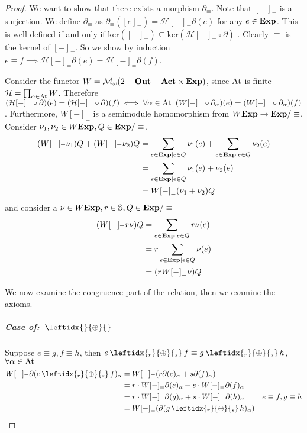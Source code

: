 \documentclass[a4paper,UKenglish,cleveref, autoref, thm-restate]{lipics-v2021}
\newcommand{\Out}{\textbf{\upshape{Out}}}
\newcommand{\Act}{\textbf{\upshape{Act}}}
\newcommand{\At}{\text{\upshape{At}}}
\newcommand{\Exp}{\textbf{\upshape{Exp}}}
\newcommand{\WC}[2]{\,\leftidx{_{#1}}{{\oplus}}{_{#2}}\,}
\newcommand{\Mon}{\mathcal{M}_\omega}
\theoremstyle{plain}\newtheoremrep{thm}{Theorem}[section]
\begin{document}
\begin{toappendix}
\begin{proof}
			We want to show that there exists a morphism $\partial_\equiv$. Note that $[-]_\equiv$ is a surjection. We define $\partial_\equiv$ as $\partial_\equiv([e]_\equiv) = \mathcal{H}[-]_\equiv \partial(e)$ for any $e \in \Exp$. This is well defined if and only if $\text{ker}([-]_\equiv)\subseteq \text{ker}(\mathcal{H}[-]_\equiv\circ\partial)$ \cite[Lemma 3.17]{gumm1999elements}. Clearly $\equiv$ is the kernel of $[-]_\equiv$. So we show by induction $e \equiv f \implies \mathcal{H}[-]_\equiv\partial(e) = \mathcal{H}[-]_\equiv\partial(f)$.
			
			Consider the functor $W = \Mon(2+\Out+\Act\times \Exp)$, since $\At$ is finite $\mathcal{H} = \prod_{\alpha \in \At} W$. Therefore $(\mathcal{H}[-]_\equiv\circ\partial)(e) = (\mathcal{H}[-]_\equiv\circ\partial)(f) \iff \forall \alpha \in \At \;\; (W[-]_\equiv \circ \partial_\alpha)(e) = (W[-]_\equiv \circ \partial_\alpha)(f)$. Furthermore, $W[-]_\equiv$ is a semimodule homomorphism from $W\Exp \to \Exp/\equiv$. Consider $\nu_1, \nu_2 \in W\Exp, Q \in \Exp/\equiv$.
			\begin{align*}
				(W[-]_\equiv \nu_1) Q + (W[-]_\equiv \nu_2) Q &= \sum_{e \in \Exp \mid e \in Q} \nu_1(e) + \sum_{e \in \Exp \mid e \in Q} \nu_2(e)\\ 
				&= \sum_{e \in \Exp \mid e \in Q} \nu_1(e)+\nu_2(e)\\
				&= W[-]_\equiv (\nu_1+\nu_2) Q
			\end{align*}
			and consider a $\nu \in W\Exp, r \in \mathbb S, Q \in \Exp/\equiv$
			\begin{align*}
				(W[-]_\equiv r\nu) Q &= \sum_{e \in \Exp \mid e \in Q} r\nu(e)\\ 
				&= r\sum_{e \in \Exp \mid e \in Q} \nu(e)\\
				&= (r W[-]_\equiv \nu) Q
			\end{align*}
			
			
			We now examine the congruence part of the relation, then we examine the axioms.
			
			\subparagraph*{Case of: $\WC{}{}$}
			Suppose $e \equiv g, f\equiv h$, then $e \WC{r}{s} f \equiv g \WC{r}{s} h$, $\forall \alpha \in \At$  
			\begin{align*}
			 W[-]_\equiv \partial(e \WC{r}{s} f)_\alpha &=  W[-]_\equiv (r\partial(e)_\alpha + s\partial(f)_\alpha)\\
			 &= r\cdot W[-]_\equiv\partial(e)_\alpha+ s\cdot W[-]_\equiv\partial(f)_\alpha &\\
				&= r\cdot W[-]_\equiv\partial(g)_\alpha + s\cdot W[-]_\equiv\partial(h)_\alpha & e \equiv f, g \equiv h\\
				&= W[-]_\equiv(\partial (g \WC{r}{s} h)_\alpha)&
			\end{align*}


\end{proof}
\end{toappendix}
\end{document}
